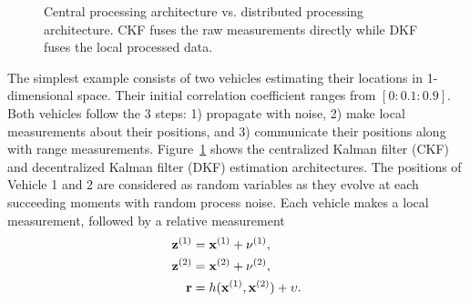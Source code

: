 \begin{figure}[htbp]
\centering
{}
\caption{Central processing architecture vs. distributed processing architecture. CKF fuses the raw measurements directly while DKF fuses the local processed data.}
\label{fig:proc2}
\end{figure}

The simplest example consists of two vehicles estimating their locations in 1-dimensional space. Their initial correlation coefficient ranges from $[0:0.1:0.9]$. Both vehicles follow the 3 steps: 1) propagate with noise, 2) make local measurements about their positions, and 3) communicate their positions along with range measurements. Figure~\ref{fig:proc2} shows the centralized Kalman filter (CKF) and decentralized Kalman filter (DKF) estimation architectures. The positions of Vehicle 1 and 2 are considered as random variables as they evolve at each succeeding moments with random process noise. Each vehicle makes a local measurement, followed by a relative measurement
\begin{equation}
\begin{split}
{\bf z}^{(1)}&={\bf x}^{(1)}+{\bf \nu}^{(1)}, \\
{\bf z}^{(2)}&={\bf x}^{(2)}+{\bf \nu}^{(2)}, \\
{\bf r}&=h({\bf x}^{(1)},{\bf x}^{(2)})+{\bf \upsilon}.
\end{split}
\end{equation}

